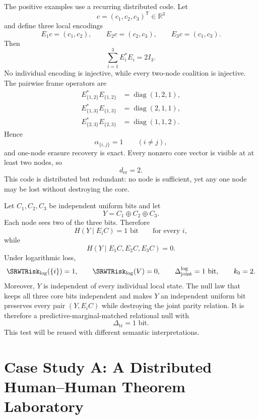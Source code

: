 
The positive examples use a recurring distributed code. Let
\[
c=(c_1,c_2,c_3)^{\mathsf T}\in\mathbb R^3
\]
and define three local encodings
\[
E_1c=(c_1,c_2),
\qquad
E_2c=(c_2,c_3),
\qquad
E_3c=(c_1,c_3).
\]
Then
\[
\sum_{i=1}^3E_i^*E_i=2I_3.
\]
No individual encoding is injective, while every two-node coalition is
injective. The pairwise frame operators are
\[
\begin{aligned}
E_{\{1,2\}}^*E_{\{1,2\}}&=\operatorname{diag}(1,2,1),\\
E_{\{1,3\}}^*E_{\{1,3\}}&=\operatorname{diag}(2,1,1),\\
E_{\{2,3\}}^*E_{\{2,3\}}&=\operatorname{diag}(1,1,2).
\end{aligned}
\]
Hence
\[
\alpha_{\{i,j\}}=1
\qquad(i\neq j),
\]
and one-node erasure recovery is exact. Every nonzero core vector is visible
at at least two nodes, so
\[
d_{\mathrm{er}}=2.
\]
This code is distributed but redundant: no node is sufficient, yet any one
node may be lost without destroying the core.


Let \(C_1,C_2,C_3\) be independent uniform bits and let
\[
Y=C_1\oplus C_2\oplus C_3.
\]
Each node sees two of the three bits. Therefore
\[
H(Y\mid E_iC)=1\text{ bit}
\qquad\text{for every }i,
\]
while
\[
H(Y\mid E_1C,E_2C,E_3C)=0.
\]
Under logarithmic loss,
\[
\SRWTRisk_{\log}(\{i\})=1,
\qquad
\SRWTRisk_{\log}(V)=0,
\qquad
\Delta_{\mathrm{joint}}^{\log}=1\text{ bit},
\qquad
k_0=2.
\]
Moreover, \(Y\) is independent of every individual local state. The null law
that keeps all three core bits independent and makes \(Y\) an independent
uniform bit preserves every pair \((Y,E_iC)\) while destroying the joint parity
relation. It is therefore a predictive-marginal-matched relational null with
\[
\Delta_{\mathrm{tr}}=1\text{ bit}.
\]
This test will be reused with different semantic interpretations.

\section{Case Study A: A Distributed Human--Human Theorem Laboratory}


